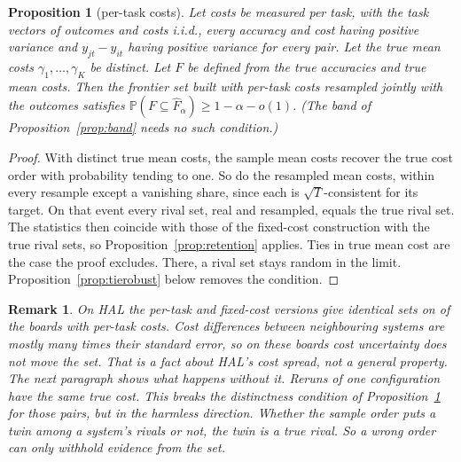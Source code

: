 \documentclass[11pt]{article}
\renewcommand{\hat}{\widehat}
\renewcommand{\Pr}{\mathbb{P}}
\newtheorem{proposition}{Proposition}
\newtheorem{remark}{Remark}
\begin{document}
\begin{proposition}[per-task costs]
\label{prop:randomcost}
Let costs be measured per task, with the task vectors of outcomes and costs i.i.d., every accuracy and cost having positive variance and $y_{jt}-y_{it}$ having positive variance for every pair. Let the true mean costs $\gamma_1,\dots,\gamma_K$ be distinct. Let $F$ be defined from the true accuracies and true mean costs. Then the frontier set built with per-task costs resampled jointly with the outcomes satisfies $\Pr(F\subseteq\hat F_\alpha)\ge1-\alpha-o(1)$. (The band of Proposition~\ref{prop:band} needs no such condition.)
\end{proposition}
\begin{proof}
With distinct true mean costs, the sample mean costs recover the true cost order with probability tending to one. So do the resampled mean costs, within every resample except a vanishing share, since each is $\sqrt T$-consistent for its target. On that event every rival set, real and resampled, equals the true rival set. The statistics then coincide with those of the fixed-cost construction with the true rival sets, so Proposition~\ref{prop:retention} applies. Ties in true mean cost are the case the proof excludes. There, a rival set stays random in the limit. Proposition~\ref{prop:tierobust} below removes the condition.
\end{proof}

\begin{remark}
On HAL the per-task and fixed-cost versions give identical sets on \NumHalBoardsSetSameFixed{} of the \NumHalBoardsPerTask{} boards with per-task costs. Cost differences between neighbouring systems are mostly many times their standard error, so on these boards cost uncertainty does not move the set. That is a fact about HAL's cost spread, not a general property. The next paragraph shows what happens without it. Reruns of one configuration have the same true cost. This breaks the distinctness condition of Proposition~\ref{prop:randomcost} for those pairs, but in the harmless direction. Whether the sample order puts a twin among a system's rivals or not, the twin is a true rival. So a wrong order can only withhold evidence from the set.
\end{remark}
\end{document}
